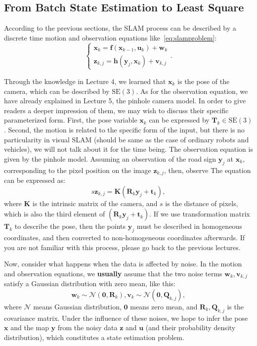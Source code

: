 \subsection{From Batch State Estimation to Least Square}
According to the previous sections, the SLAM process can be described by a discrete time motion and observation equations like~\eqref{eq:slamproblem}:
\begin{equation}
\left\{ \begin{array}{l}
{\bm{x}_k} = \mathbf{f}\left( {{\bm{x}_{k - 1}},{\bm{u}_k}} \right) + \bm{w}_k\\
{\bm{z}_{k,j}} = \mathbf{h}\left( {{ \bm{y}_j},{ \bm{x}_k}}  \right)+ \bm{v}_{k,j}
\end{array} \right. .
\end{equation}

Through the knowledge in Lecture 4, we learned that $ \bm {x} _k $ is the pose of the camera, which can be described by $ \mathrm {SE} (3) $. As for the observation equation, we have already explained in Lecture 5, the pinhole camera model. In order to give readers a deeper impression of them, we may wish to discuss their specific parameterized form. First, the pose variable $\bm {x} _k $ can be expressed by $\bm {T} _k \in \mathrm {SE} (3) $. Second, the motion is related to the specific form of the input, but there is no particularity in visual SLAM (should be same as the case of ordinary robots and vehicles), we will not talk about it for the time being. The observation equation is given by the pinhole model. Assuming an observation of the road sign $ \bm {y} _j $ at $ \bm {x} _k $, corresponding to the pixel position on the image $ \bm {z} _ {k, j} $, then, observe The equation can be expressed as:
\begin{equation}
s \bm{z}_{k,j}= \bm{K} (\bm{R}_k {\bm{y}_j}+\bm{t}_k),
\end{equation}
where $ \bm {K} $ is the intrinsic matrix of the camera, and $s$ is the distance of pixels, which is also the third element of $ (\bm {R} _k {\bm {y} _j} + \bm {t} _k) $. If we use  transformation matrix $ \bm {T} _k $ to describe the pose, then the points $ \bm {y} _j $ must be described in homogeneous coordinates, and then converted to non-homogeneous coordinates afterwards. If you are not familiar with this process, please go back to the previous lectures.

Now, consider what happens when the data is affected by noise. In the motion and observation equations, we \textbf {usually} assume that the two noise terms $ \bm {w} _k, \bm {v} _ {k, j} $ satisfy a Gaussian distribution with zero mean, like this:
\begin{equation}
{\bm{w}_k} \sim \mathcal{N}\left( {\bm{0},{\bm{R}_k}} \right),{\bm{v}_k} \sim \mathcal{N}\left( {\bm{0},{{{\bm{Q}}}_{k,j}}} \right),
\end{equation}
where $ \mathcal {N} $ means Gaussian distribution, $ \bm{0} $ means zero mean, and $ \bm {R} _k, \bm {Q} _ {k, j} $ is the covariance matrix. Under the influence of these noises, we hope to infer the pose $ \bm {x} $ and the map $ \bm {y} $ from the noisy data $ \bm {z} $ and $ \bm {u} $ (and their probability density distribution), which constitutes a state estimation problem.

